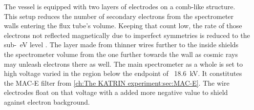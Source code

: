       The vessel is equipped with two layers of electrodes on a comb-like structure. This setup reduces the number of secondary electrons from the spectrometer walls entering the flux tube's volume. Keeping that count low, the rate of those electrons not reflected magnetically due to imperfect symmetries is reduced to the sub-\SI{}{\electronvolt} level \cite{wireElectrodeSystem}. The layer made from thinner wires further to the inside shields the spectrometer volume from the one further towards the wall as cosmic rays may unleash electrons there as well.
      The main spectrometer as a whole is set to high voltage varied in the region below the endpoint of ~\SI{18.6}{\kilo\volt}. It constitutes the MAC-E filter from \ref{ch:The KATRIN experiment:sec:MAC-E}. The wire electrodes float on that voltage with a added more negative value to shield against electron background.
